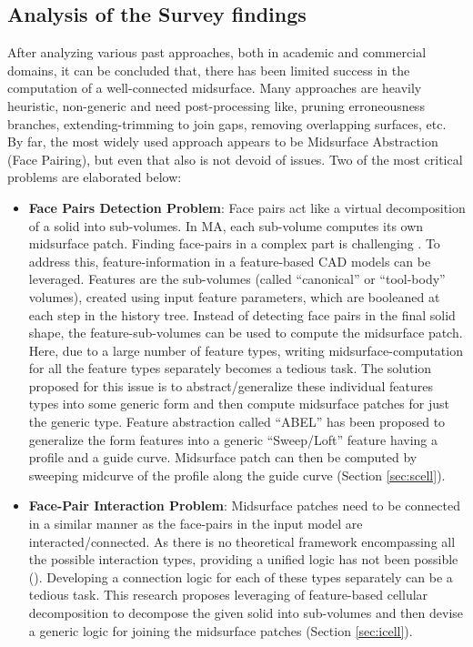 \subsection{Analysis of the Survey findings}
 
 After analyzing various past approaches, both in academic and commercial domains, it can be concluded that,  there has been limited success in the computation of a well-connected midsurface. Many approaches are heavily heuristic, non-generic and need post-processing like, pruning erroneousness branches, extending-trimming to join gaps, removing overlapping surfaces, etc.  By far, the most widely used approach appears to be Midsurface Abstraction (Face Pairing), but even that also is not devoid of issues.  Two of the most critical problems are elaborated below:
	

\begin{itemize}[noitemsep,topsep=2pt,parsep=2pt,partopsep=2pt]%
	\item  \textbf{Face Pairs Detection Problem}:  \label{sec:facepairdetection}
Face pairs act like a virtual decomposition of a solid into sub-volumes. In MA, each sub-volume computes its own midsurface patch. Finding face-pairs in a complex part is challenging \cite{Boussuge2013}. To address this, feature-information in a feature-based CAD models can be leveraged.  Features are the sub-volumes (called ``canonical'' or ``tool-body'' volumes), created using input feature parameters, which are booleaned at each step in the history tree. Instead of detecting face pairs in the final solid shape, the feature-sub-volumes can be used to compute the midsurface patch.  Here, due to a large number of feature types, writing midsurface-computation for all the feature types separately becomes a tedious task. The solution proposed for this issue is to abstract/generalize these individual features types into some generic form and then compute midsurface patches for just the generic type. Feature abstraction called ``ABEL'' has been proposed to generalize the form features into a generic ``Sweep/Loft'' feature having a profile and a guide curve. Midsurface patch can then be computed by sweeping midcurve of the profile along the guide curve (Section \ref{sec:scell}). %

	\item  \textbf{Face-Pair Interaction Problem}: \label{sec:facepairinteraction}
Midsurface patches need to be connected in a similar manner as the face-pairs in the input model are interacted/connected. As there is no theoretical framework encompassing all the possible interaction types, providing a unified logic has not been possible (\cite{Stolt2006}).   Developing a connection logic for each of these types separately can be a tedious task. This research proposes  leveraging of feature-based cellular decomposition to decompose the given solid into sub-volumes and then devise a generic logic for joining the midsurface patches (Section \ref{sec:icell}).
\end{itemize}
 